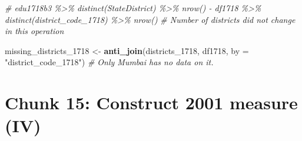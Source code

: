 \documentclass[
]{article}
\newenvironment{Shaded}{\begin{snugshade}}{\end{snugshade}}
\newcommand{\AttributeTok}[1]{\textcolor[rgb]{0.13,0.29,0.53}{#1}}
\newcommand{\CommentTok}[1]{\textcolor[rgb]{0.56,0.35,0.01}{\textit{#1}}}
\newcommand{\FunctionTok}[1]{\textcolor[rgb]{0.13,0.29,0.53}{\textbf{#1}}}
\newcommand{\NormalTok}[1]{#1}
\newcommand{\OtherTok}[1]{\textcolor[rgb]{0.56,0.35,0.01}{#1}}
\newcommand{\StringTok}[1]{\textcolor[rgb]{0.31,0.60,0.02}{#1}}
\begin{document}
\begin{Shaded}
\begin{Highlighting}[]
\CommentTok{\# edu1718b3 \%\textgreater{}\% distinct(StateDistrict) \%\textgreater{}\% nrow() {-} df1718 \%\textgreater{}\% distinct(district\_code\_1718) \%\textgreater{}\% nrow()}
\CommentTok{\# Number of districts did not change in this operation}

\NormalTok{missing\_districts\_1718 }\OtherTok{\textless{}{-}} \FunctionTok{anti\_join}\NormalTok{(districts\_1718, df1718, }\AttributeTok{by =} \StringTok{"district\_code\_1718"}\NormalTok{)}
\CommentTok{\# Only Mumbai has no data on it.}
\end{Highlighting}
\end{Shaded}

\section*{Chunk 15: Construct 2001 measure (IV)}\label{chunk-15-construct-2001-measure-iv}
\end{document}
